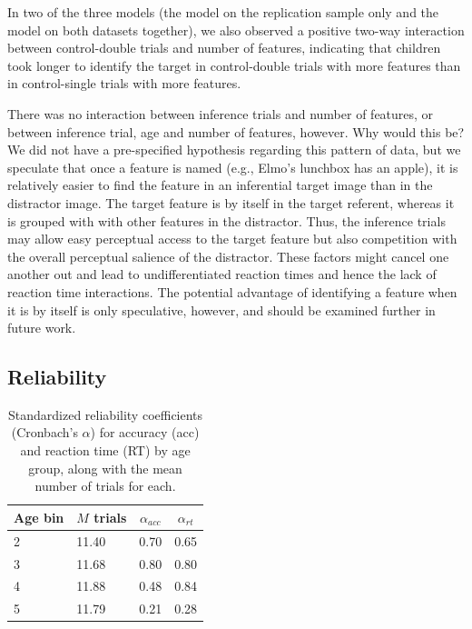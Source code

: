 \documentclass[man]{apa6}
\begin{document}
In two of the three models (the model on the replication sample only and
the model on both datasets together), we also observed a positive
two-way interaction between control-double trials and number of
features, indicating that children took longer to identify the target in
control-double trials with more features than in control-single trials
with more features.

There was no interaction between inference trials and number of
features, or between inference trial, age and number of features,
however. Why would this be? We did not have a pre-specified hypothesis
regarding this pattern of data, but we speculate that once a feature is
named (e.g., Elmo's lunchbox has an apple), it is relatively easier to
find the feature in an inferential target image than in the distractor
image. The target feature is by itself in the target referent, whereas
it is grouped with with other features in the distractor. Thus, the
inference trials may allow easy perceptual access to the target feature
but also competition with the overall perceptual salience of the
distractor. These factors might cancel one another out and lead to
undifferentiated reaction times and hence the lack of reaction time
interactions. The potential advantage of identifying a feature when it
is by itself is only speculative, however, and should be examined
further in future work.

\subsection{Reliability}\label{reliability}

\begin{table}[tbp]
\begin{center}
\begin{threeparttable}
\caption{\label{tab:alphaTable}Standardized reliability coefficients (Cronbach's $\alpha$) for accuracy (acc) and reaction time (RT) by age group, along with the mean number of trials for each.}
\begin{tabular}{llll}
\toprule
Age bin & \multicolumn{1}{c}{$M$ trials} & \multicolumn{1}{c}{$\alpha_{acc}$} & \multicolumn{1}{c}{$\alpha_{rt}$}\\
\midrule
2 & 11.40 & 0.70 & 0.65\\
3 & 11.68 & 0.80 & 0.80\\
4 & 11.88 & 0.48 & 0.84\\
5 & 11.79 & 0.21 & 0.28\\
\bottomrule
\end{tabular}
\end{threeparttable}
\end{center}
\end{table}
\end{document}
